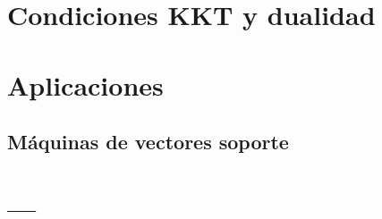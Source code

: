 \documentclass[palatino,nochap]{apuntes}
\begin{document}
\chapter{Condiciones KKT y dualidad}

\chapter{Aplicaciones}
\section{Máquinas de vectores soporte}

\appendix

\chapter{---}

\printindex
\end{document}
